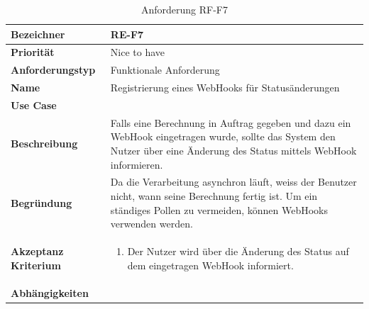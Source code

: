\begin{table}[ht]
\centering
  \begin{tabular}{ l | p{8cm} }
	\hline
	\rowcolor{gray}
	\textbf{Bezeichner}&	\textbf{RE-F7}\\ \hline
	\textbf{Priorität} 		&	Nice to have\\ \hline
	\textbf{Anforderungstyp}	&	Funktionale Anforderung\\ \hline
	\textbf{Name} 			&	Registrierung eines WebHooks für Statusänderungen\\ \hline
	\textbf{Use Case} 		&	\nameref{table:use_case_4}\\ \hline
	\textbf{Beschreibung} 	&	Falls eine Berechnung in Auftrag gegeben und dazu ein WebHook eingetragen wurde, sollte das System den Nutzer über eine Änderung des Status mittels 
						WebHook informieren.\\ \hline
	\textbf{Begründung} 		&	Da die Verarbeitung asynchron läuft, weiss der Benutzer nicht, wann seine Berechnung fertig ist. Um ein ständiges Pollen zu vermeiden, können 
							WebHooks verwenden werden.\\ \hline
	\textbf{Akzeptanz Kriterium}	&	\begin{enumerate}
					\item Der Nutzer wird über die Änderung des Status auf dem eingetragen WebHook informiert.
					\end{enumerate}
					\\ \hline
	\textbf{Abhängigkeiten} 	&	\nameref{table:req_2}\\ \hline
  \end{tabular}
   \caption{Anforderung RF-F7}\label{table:req_7}
\end{table}

